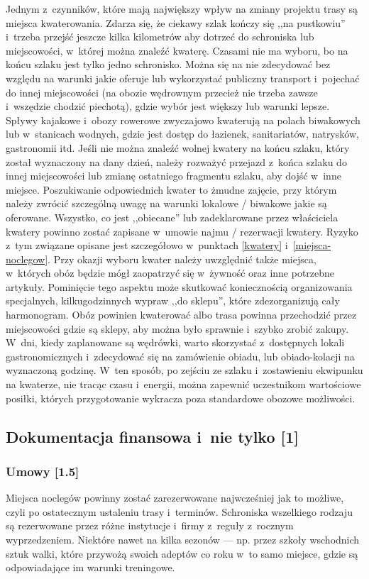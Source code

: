 \documentclass[a5paper,10pt,titlepage,twoside]{article}
\begin{document}
Jednym z~czynników, które mają największy wpływ na zmiany projektu trasy są miejsca kwaterowania. Zdarza się, że ciekawy szlak kończy się ,,na pustkowiu'' i~trzeba przejść jeszcze kilka kilometrów aby dotrzeć do schroniska lub miejscowości, w~której można znaleźć kwaterę. Czasami nie ma wyboru, bo na końcu szlaku jest tylko jedno schronisko. Można się na nie zdecydować bez względu na warunki jakie oferuje lub wykorzystać publiczny transport i~pojechać do innej miejscowości (na obozie wędrownym przecież nie trzeba zawsze i~wszędzie chodzić piechotą), gdzie wybór jest większy lub warunki lepsze. Spływy kajakowe i~obozy rowerowe zwyczajowo kwaterują na polach biwakowych lub w~stanicach wodnych, gdzie jest dostęp do łazienek, sanitariatów, natrysków, gastronomii itd. Jeśli nie można znaleźć wolnej kwatery na końcu szlaku, który został wyznaczony na dany dzień, należy rozważyć przejazd z~końca szlaku do innej miejscowości lub zmianę ostatniego fragmentu szlaku, aby dojść w~inne miejsce. Poszukiwanie odpowiednich kwater to żmudne zajęcie, przy którym należy zwrócić szczególną uwagę na warunki lokalowe / biwakowe jakie są oferowane. Wszystko, co jest ,,obiecane'' lub zadeklarowane przez właściciela kwatery powinno zostać zapisane w~umowie najmu / rezerwacji kwatery. Ryzyko z~tym związane opisane jest szczegółowo w~punktach \ref{kwatery} i~\ref{miejsca-noclegow}. Przy okazji wyboru kwater należy uwzględnić także miejsca, w~których obóz będzie mógł zaopatrzyć się w~żywność oraz inne potrzebne artykuły. Pominięcie tego aspektu może skutkować koniecznością organizowania specjalnych, kilkugodzinnych wypraw ,,do sklepu'', które zdezorganizują cały harmonogram. Obóz powinien kwaterować albo trasa powinna przechodzić przez miejscowości gdzie są sklepy, aby można było sprawnie i~szybko zrobić zakupy. W~dni, kiedy zaplanowane są wędrówki, warto skorzystać z~dostępnych lokali gastronomicznych i~zdecydować się na zamówienie obiadu, lub obiado-kolacji na wyznaczoną godzinę. W~ten sposób, po zejściu ze szlaku i~zostawieniu ekwipunku na kwaterze, nie tracąc czasu i~energii, można zapewnić uczestnikom wartościowe posiłki, których przygotowanie wykracza poza standardowe obozowe możliwości.

\subsection{Dokumentacja finansowa i~nie tylko [1]}
\subsubsection{Umowy [1.5]}
Miejsca noclegów powinny zostać zarezerwowane najwcześniej jak to możliwe, czyli po ostatecznym ustaleniu trasy i~terminów. Schroniska wszelkiego rodzaju są rezerwowane przez różne instytucje i~firmy z~reguły z~rocznym wyprzedzeniem. Niektóre nawet na kilka sezonów --- np. przez szkoły wschodnich sztuk walki, które przywożą swoich adeptów co roku w~to samo miejsce, gdzie są odpowiadające im warunki treningowe.
\end{document}

